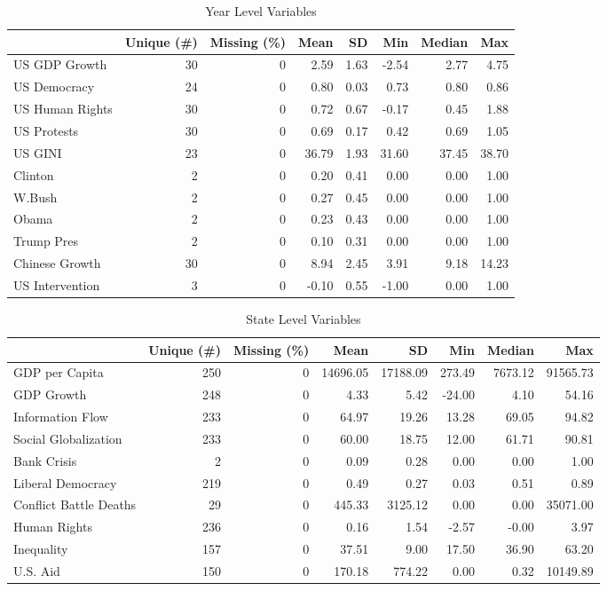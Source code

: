 \documentclass[12pt]{article}
\begin{document}
 
\begin{table}
\caption{\label{tab:year-vars}Year Level Variables}
\centering
\begin{tabular}[t]{lrrrrrrr}
\toprule
  & Unique (\#) & Missing (\%) & Mean & SD & Min & Median & Max\\
\midrule
US GDP Growth & 30 & 0 & 2.59 & 1.63 & -2.54 & 2.77 & 4.75\\
US Democracy & 24 & 0 & 0.80 & 0.03 & 0.73 & 0.80 & 0.86\\
US Human Rights & 30 & 0 & 0.72 & 0.67 & -0.17 & 0.45 & 1.88\\
US Protests & 30 & 0 & 0.69 & 0.17 & 0.42 & 0.69 & 1.05\\
US GINI & 23 & 0 & 36.79 & 1.93 & 31.60 & 37.45 & 38.70\\
Clinton & 2 & 0 & 0.20 & 0.41 & 0.00 & 0.00 & 1.00\\
W.Bush & 2 & 0 & 0.27 & 0.45 & 0.00 & 0.00 & 1.00\\
Obama & 2 & 0 & 0.23 & 0.43 & 0.00 & 0.00 & 1.00\\
Trump Pres & 2 & 0 & 0.10 & 0.31 & 0.00 & 0.00 & 1.00\\
Chinese Growth & 30 & 0 & 8.94 & 2.45 & 3.91 & 9.18 & 14.23\\
US Intervention & 3 & 0 & -0.10 & 0.55 & -1.00 & 0.00 & 1.00\\
\bottomrule
\end{tabular}
\end{table}



\begin{table}
\caption{\label{tab:state-vars}State Level Variables}
\begin{adjustbox}{width= .95\textwidth, center}
\begin{tabular}[t]{lrrrrrrr}
\toprule
  & Unique (\#) & Missing (\%) & Mean & SD & Min & Median & Max\\
\midrule
GDP per Capita & 250 & 0 & 14696.05 & 17188.09 & 273.49 & 7673.12 & 91565.73\\
GDP Growth & 248 & 0 & 4.33 & 5.42 & -24.00 & 4.10 & 54.16\\
Information Flow & 233 & 0 & 64.97 & 19.26 & 13.28 & 69.05 & 94.82\\
Social Globalization & 233 & 0 & 60.00 & 18.75 & 12.00 & 61.71 & 90.81\\
Bank Crisis & 2 & 0 & 0.09 & 0.28 & 0.00 & 0.00 & 1.00\\
Liberal Democracy & 219 & 0 & 0.49 & 0.27 & 0.03 & 0.51 & 0.89\\
Conflict Battle Deaths & 29 & 0 & 445.33 & 3125.12 & 0.00 & 0.00 & 35071.00\\
Human Rights & 236 & 0 & 0.16 & 1.54 & -2.57 & -0.00 & 3.97\\
Inequality & 157 & 0 & 37.51 & 9.00 & 17.50 & 36.90 & 63.20\\
U.S. Aid & 150 & 0 & 170.18 & 774.22 & 0.00 & 0.32 & 10149.89\\
\bottomrule
\end{tabular}
\end{adjustbox}
\end{table}
\end{document}
